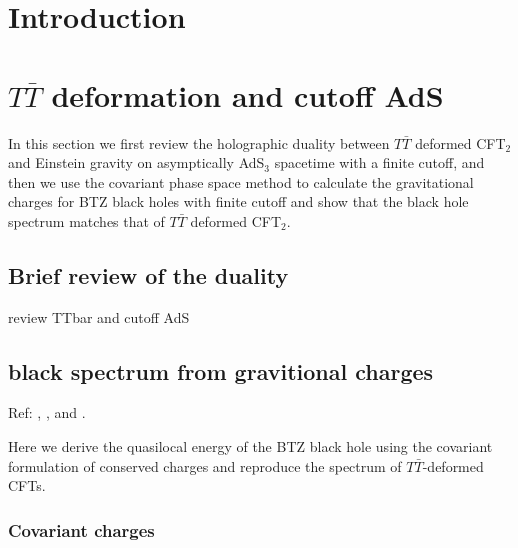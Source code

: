 \documentclass[11pt,a4paper]{article}
\begin{document}
	
\pagebreak

\section{Introduction}

\section{$T \bar T$ deformation and cutoff AdS}
In this section we first review the holographic duality between $T\bar T$ deformed CFT$_2$ and Einstein gravity on asymptically AdS$_3$ spacetime with a finite cutoff,  and then we use the covariant phase space method to calculate the gravitational charges for BTZ black holes with finite cutoff and show that the black hole spectrum matches that of  $T\bar T$ deformed CFT$_2$. 

\subsection{Brief review of the duality}

review TTbar and cutoff AdS


\subsection{black spectrum from gravitional charges}
	Ref: \textcite{Wald:1993nt,Iyer:1994ys,Iyer:1995kg}, \textcite{Lewkowycz:2013nqa}, and \textcite{Faulkner:2013ana}.
	
	Here we derive the quasilocal energy of the BTZ black hole using the covariant formulation of conserved charges and reproduce the spectrum of $T\bar{T}$-deformed CFTs. 
	
\subsubsection*{Covariant charges}
	
\end{document}
